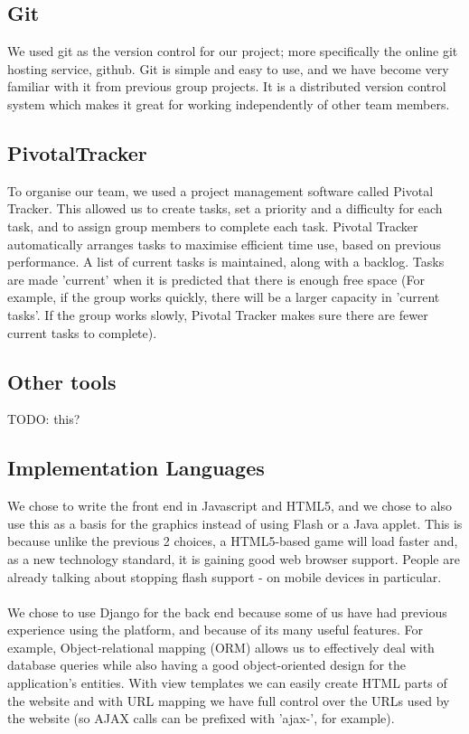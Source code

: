 \documentclass{article}
\begin{document}
\subsection{Git}
We used git as the version control for our project; more specifically the online git hosting service, github. Git is simple and easy to use, and we have become very familiar with it from previous group projects. It is a distributed version control system which makes it great for working independently of other team members.

\subsection{PivotalTracker}
To organise our team, we used a project management software called Pivotal Tracker. This allowed us to create tasks, set a priority and a difficulty for each task, and to assign group members to complete each task. Pivotal Tracker automatically arranges tasks to maximise efficient time use, based on previous performance. A list of current tasks is maintained, along with a backlog. Tasks are made 'current' when it is predicted that there is enough free space (For example, if the group works quickly, there will be a larger capacity in 'current tasks'. If the group works slowly, Pivotal Tracker makes sure there are fewer current tasks to complete).

\subsection{Other tools}
TODO: this?

\subsection{Implementation Languages}
We chose to write the front end in Javascript and HTML5, and we chose to also use this as a basis for the graphics instead of using Flash or a Java applet. This is because unlike the previous 2 choices, a HTML5-based game will load faster and, as a new technology standard, it is gaining good web browser support. People are already talking about stopping flash support - on mobile devices in particular. \\ \\
We chose to use Django for the back end because some of us have had previous experience using the platform, and because of its many useful features. For example, Object-relational mapping (ORM) allows us to effectively deal with database queries while also having a good object-oriented design for the application's entities. With view templates we can easily create HTML parts of the website and with URL mapping we have full control over the URLs used by the website (so AJAX calls can be prefixed with 'ajax-', for example).
\end{document}
